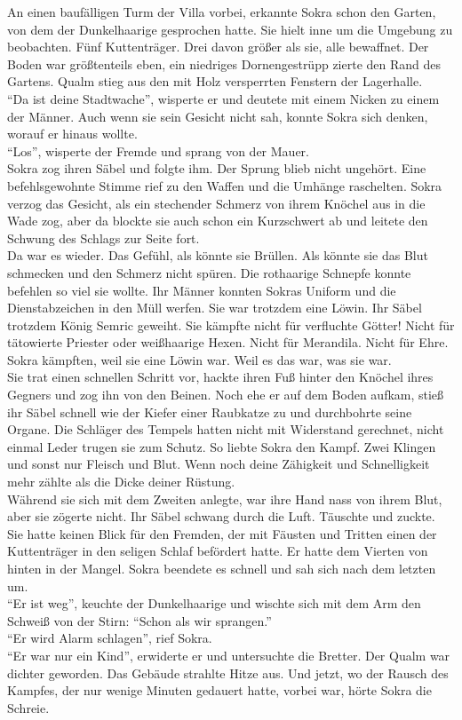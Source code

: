An einen baufälligen Turm der Villa vorbei, erkannte Sokra schon den Garten, von dem der 
Dunkelhaarige gesprochen hatte. Sie hielt inne um die Umgebung zu beobachten. Fünf Kuttenträger. 
Drei davon größer als sie, alle bewaffnet. Der Boden war größtenteils eben, ein niedriges 
Dornengestrüpp zierte den Rand des Gartens. Qualm stieg aus den mit Holz versperrten Fenstern der 
Lagerhalle.\\
``Da ist deine Stadtwache'', wisperte er und deutete mit einem Nicken zu einem der Männer. Auch 
wenn sie sein Gesicht nicht sah, konnte Sokra sich denken, worauf er hinaus wollte.\\
``Los'', wisperte der Fremde und sprang von der Mauer.\\
Sokra zog ihren Säbel und folgte ihm. Der Sprung blieb nicht ungehört. Eine befehlsgewohnte Stimme 
rief zu den Waffen und die Umhänge raschelten. Sokra verzog das Gesicht, als ein stechender Schmerz 
von ihrem Knöchel aus in die Wade zog, aber da blockte sie auch schon ein Kurzschwert ab und 
leitete den Schwung des Schlags zur Seite fort.\\
Da war es wieder. Das Gefühl, als könnte sie Brüllen. Als könnte sie das Blut schmecken und den 
Schmerz nicht spüren. Die rothaarige Schnepfe konnte befehlen so viel sie wollte. Ihr Männer 
konnten Sokras Uniform und die Dienstabzeichen in den Müll werfen. Sie war trotzdem eine Löwin. Ihr 
Säbel trotzdem König Semric geweiht. Sie kämpfte nicht für verfluchte Götter! Nicht für 
tätowierte Priester oder weißhaarige Hexen. Nicht für Merandila. Nicht für Ehre. Sokra kämpften, 
weil sie eine Löwin war. Weil es das war, was sie war.\\
Sie trat einen schnellen Schritt vor, hackte ihren Fuß hinter den Knöchel ihres Gegners und zog ihn 
von den Beinen. Noch ehe er auf dem Boden aufkam, stieß ihr Säbel schnell wie der Kiefer einer 
Raubkatze zu und durchbohrte seine Organe. Die Schläger des Tempels hatten nicht mit Widerstand 
gerechnet, nicht einmal Leder trugen sie zum Schutz. So liebte Sokra den Kampf. Zwei Klingen und 
sonst nur Fleisch und Blut. Wenn noch deine Zähigkeit und Schnelligkeit mehr zählte als die Dicke 
deiner Rüstung.\\
Während sie sich mit dem Zweiten anlegte, war ihre Hand nass von ihrem Blut, aber sie zögerte 
nicht. Ihr Säbel schwang durch die Luft. Täuschte und zuckte. Sie hatte keinen Blick für den 
Fremden, der mit Fäusten und Tritten einen der Kuttenträger in den seligen Schlaf befördert hatte. 
Er hatte dem Vierten von hinten in der Mangel. Sokra beendete es schnell und sah sich nach dem 
letzten um.\\
``Er ist weg'', keuchte der Dunkelhaarige und wischte sich mit dem Arm den Schweiß von der Stirn: 
``Schon als wir sprangen.''\\
``Er wird Alarm schlagen'', rief Sokra.\\
``Er war nur ein Kind'', erwiderte er und untersuchte die Bretter. Der Qualm war dichter geworden. 
Das Gebäude strahlte Hitze aus. Und jetzt, wo der Rausch des Kampfes, der nur wenige Minuten 
gedauert hatte, vorbei war, hörte Sokra die Schreie.\\

